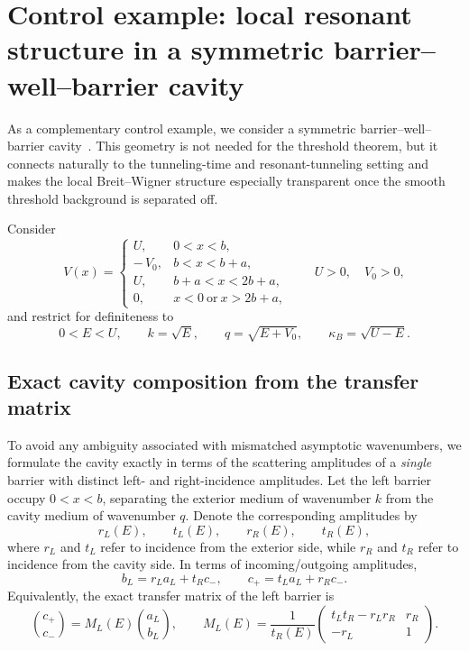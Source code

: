\documentclass[aps,pra,preprint,notitlepage,nofootinbib]{revtex4-2}
\begin{document}
\section{Control example: local resonant structure in a symmetric barrier--well--barrier cavity}
\label{sec:bwb}

As a complementary control example, we consider a symmetric
barrier--well--barrier cavity~\cite{Hartman1962,Calcada2009,Lunardi2011}.
This geometry is not needed for the threshold theorem, but it connects naturally
to the tunneling-time and resonant-tunneling setting and makes the local
Breit--Wigner structure especially transparent once the smooth threshold
background is separated off.

Consider
\begin{equation}
V(x)=
\begin{cases}
U, & 0<x<b,\\
-\,V_0, & b<x<b+a,\\
U, & b+a<x<2b+a,\\
0, & x<0 \ \text{or}\ x>2b+a,
\end{cases}
\qquad
U>0,
\quad
V_0>0,
\label{eq:bwb-potential}
\end{equation}
and restrict for definiteness to
\begin{equation}
0<E<U,
\qquad
k=\sqrt{E},
\qquad
q=\sqrt{E+V_0},
\qquad
\kappa_B=\sqrt{U-E}.
\label{eq:bwb-scales}
\end{equation}


\subsection{Exact cavity composition from the transfer matrix}

To avoid any ambiguity associated with mismatched asymptotic wavenumbers, we formulate the cavity exactly in terms of the scattering amplitudes of a \emph{single} barrier with distinct left- and right-incidence amplitudes. Let the left barrier occupy $0<x<b$, separating the exterior medium of wavenumber $k$ from the cavity medium of wavenumber $q$. Denote the corresponding amplitudes by
\begin{equation}
r_L(E),\qquad t_L(E),\qquad r_R(E),\qquad t_R(E),
\label{eq:singlebarrier-amps}
\end{equation}
where $r_L$ and $t_L$ refer to incidence from the exterior side, while $r_R$ and $t_R$ refer to incidence from the cavity side. In terms of incoming/outgoing amplitudes,
\begin{equation}
b_L=r_L a_L+t_R c_-,
\qquad
c_+=t_L a_L+r_R c_-.
\label{eq:leftbarrier-scatt}
\end{equation}
Equivalently, the exact transfer matrix of the left barrier is
\begin{equation}
\binom{c_+}{c_-}
=
M_L(E)
\binom{a_L}{b_L},
\qquad
M_L(E)=\frac{1}{t_R(E)}
\begin{pmatrix}
t_L t_R-r_L r_R & r_R \\
-r_L & 1
\end{pmatrix}.
\label{eq:ML-def}
\end{equation}
\end{document}
